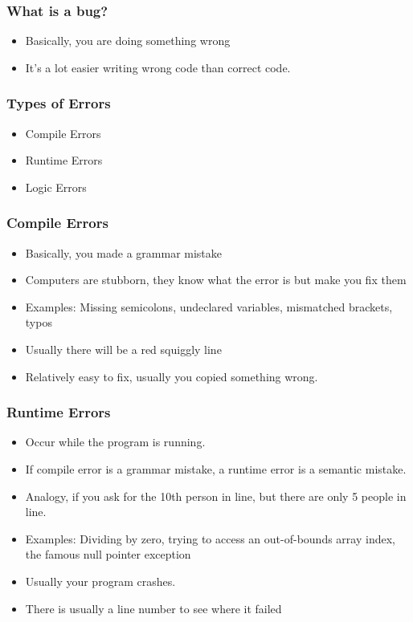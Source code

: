 \documentclass[aspectratio=169,hyperref={unicode}]{beamer}
\begin{document}
\begin{frame}
\frametitle{What is a bug?}
\begin{itemize}
        \item Basically, you are doing something wrong
\item It's a lot easier writing wrong code than correct code.
\end{itemize}
\end{frame}

\begin{frame}
\frametitle{Types of Errors}
\begin{itemize}
\item Compile Errors
\item Runtime Errors
\item Logic Errors
\end{itemize}
\end{frame}

\begin{frame}
\frametitle{Compile Errors}
\begin{itemize}
\item Basically, you made a grammar mistake
\item Computers are stubborn, they know what the error is but make you fix them
\item Examples: Missing semicolons, undeclared variables, mismatched brackets, typos
  \item Usually there will be a red squiggly line
        \item Relatively easy to fix, usually you copied something wrong.
\end{itemize}
\end{frame}

\begin{frame}
\frametitle{Runtime Errors}
\begin{itemize}
\item Occur while the program is running.
  \item If compile error is a grammar mistake, a runtime error is a semantic mistake.
        \item Analogy, if you ask for the 10th person in line, but there are only 5 people in line.
\item Examples: Dividing by zero, trying to access an out-of-bounds array index, the famous null pointer exception
\item Usually your program crashes.
\item There is usually a line number to see where it failed
\end{itemize}
\end{frame}
\end{document}
